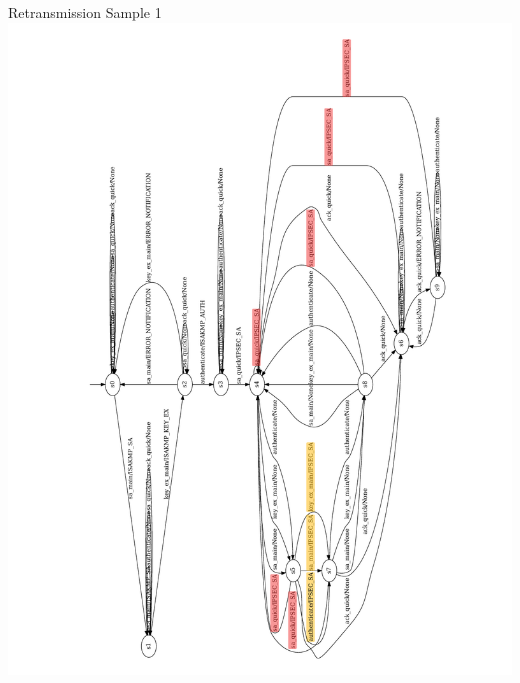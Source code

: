 \documentclass[aspectratio=169, xcolor=table]{beamer}
\begin{document}
\iffalse
	\begin{frame}{Retransmission Sample 1}
		\vspace{-2.7em}
		\centering
		\includegraphics[height=1.45\textheight, angle=270, trim={8em 0 0 0},clip]{models/retransmissions/retrans_case1_lstar}
	\end{frame}
	
\end{document}
